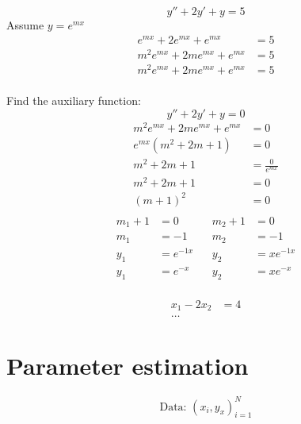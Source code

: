 \documentclass[
	date={August 21{,} 2024}
]{math486notes}
\begin{document}
\begin{example}
	\[ y'' + 2y' + y = 5 \]
	Assume $y=e^{mx}$
	\begin{equation*}
	\begin{aligned}
		e^{mx} + 2e^{mx} + e^{mx} &= 5\\
		m^{2}e^{mx} + 2me^{mx} + e^{mx} &= 5\\
		m^{2}e^{mx} + 2me^{mx} + e^{mx} &= 5\\
	\end{aligned}
	\end{equation*}

	Find the auxiliary function:
	\[ y'' + 2y' + y = 0 \]
	\begin{equation*}
		\begin{aligned}
			m^{2}e^{mx} + 2me^{mx} + e^{mx} &= 0\\
			e^{mx}\left(m^{2} + 2m + 1\right) &= 0\\
			m^{2} + 2m + 1 &= \frac{0}{e^{mx}}\\
			m^{2} + 2m + 1 &= 0\\
			(m+1)^{2} &= 0\\
		\end{aligned}
	\end{equation*}
	\begin{equation*}
	\begin{aligned}
		m_{1}+1 &= 0\ \ & \ \ m_{2} + 1 &= 0\\
		m_{1} &= -1\ \ & \ \ m_{2} &= -1\\
		y_{1} &= e^{-1x}\ \ & \ \ y_{2} &= xe^{-1x}\\
		y_{1} &= e^{-x}\ \ & \ \ y_{2} &= xe^{-x}\\
	\end{aligned}
	\end{equation*}
\end{example}

\begin{example}
	\begin{equation*}
	\begin{aligned}
		x_{1} - 2x_{2} &= 4\\
		\dots&
	\end{aligned}
	\end{equation*}
\end{example}

\section{Parameter estimation}\label{sec:parameter-estimation}
\[ \mbox{Data: } (x_{i}, y_{x})^{N}_{i=1} \]
\end{document}
